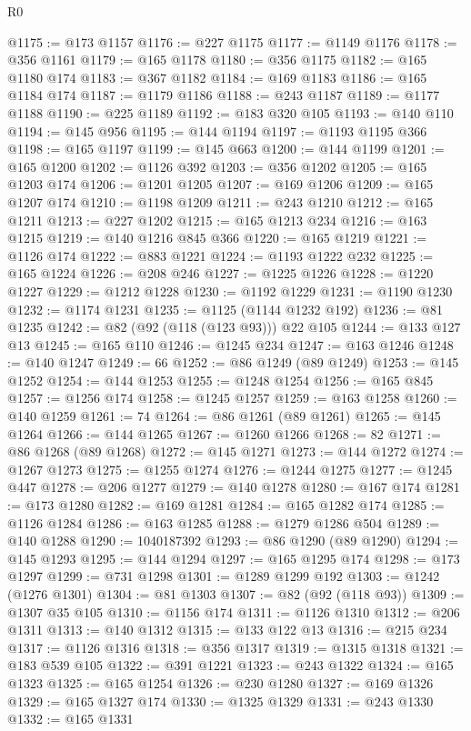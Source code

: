 \begin{lexlean}{R0}
\begin{coremodule}
@1175 := @173 @1157
@1176 := @227 @1175
@1177 := @1149 @1176
@1178 := @356 @1161
@1179 := @165 @1178
@1180 := @356 @1175
@1182 := @165 @1180 @174
@1183 := @367 @1182
@1184 := @169 @1183
@1186 := @165 @1184 @174
@1187 := @1179 @1186
@1188 := @243 @1187
@1189 := @1177 @1188
@1190 := @225 @1189
@1192 := @183 @320 @105
@1193 := @140 @110
@1194 := @145 @956
@1195 := @144 @1194
@1197 := @1193 @1195 @366
@1198 := @165 @1197
@1199 := @145 @663
@1200 := @144 @1199
@1201 := @165 @1200
@1202 := @1126 @392
@1203 := @356 @1202
@1205 := @165 @1203 @174
@1206 := @1201 @1205
@1207 := @169 @1206
@1209 := @165 @1207 @174
@1210 := @1198 @1209
@1211 := @243 @1210
@1212 := @165 @1211
@1213 := @227 @1202
@1215 := @165 @1213 @234
@1216 := @163 @1215
@1219 := @140 @1216 @845 @366
@1220 := @165 @1219
@1221 := @1126 @174
@1222 := @883 @1221
@1224 := @1193 @1222 @232
@1225 := @165 @1224
@1226 := @208 @246
@1227 := @1225 @1226
@1228 := @1220 @1227
@1229 := @1212 @1228
@1230 := @1192 @1229
@1231 := @1190 @1230
@1232 := @1174 @1231
@1235 := @1125 (@1144 @1232 @192)
@1236 := @81 @1235
@1242 := @82 (@92 (@118 (@123 @93))) @22 @105
@1244 := @133 @127 @13
@1245 := @165 @110
@1246 := @1245 @234
@1247 := @163 @1246
@1248 := @140 @1247
@1249 := 66
@1252 := @86 @1249 (@89 @1249)
@1253 := @145 @1252
@1254 := @144 @1253
@1255 := @1248 @1254
@1256 := @165 @845
@1257 := @1256 @174
@1258 := @1245 @1257
@1259 := @163 @1258
@1260 := @140 @1259
@1261 := 74
@1264 := @86 @1261 (@89 @1261)
@1265 := @145 @1264
@1266 := @144 @1265
@1267 := @1260 @1266
@1268 := 82
@1271 := @86 @1268 (@89 @1268)
@1272 := @145 @1271
@1273 := @144 @1272
@1274 := @1267 @1273
@1275 := @1255 @1274
@1276 := @1244 @1275
@1277 := @1245 @447
@1278 := @206 @1277
@1279 := @140 @1278
@1280 := @167 @174
@1281 := @173 @1280
@1282 := @169 @1281
@1284 := @165 @1282 @174
@1285 := @1126 @1284
@1286 := @163 @1285
@1288 := @1279 @1286 @504
@1289 := @140 @1288
@1290 := 1040187392
@1293 := @86 @1290 (@89 @1290)
@1294 := @145 @1293
@1295 := @144 @1294
@1297 := @165 @1295 @174
@1298 := @173 @1297
@1299 := @731 @1298
@1301 := @1289 @1299 @192
@1303 := @1242 (@1276 @1301)
@1304 := @81 @1303
@1307 := @82 (@92 (@118 @93))
@1309 := @1307 @35 @105
@1310 := @1156 @174
@1311 := @1126 @1310
@1312 := @206 @1311
@1313 := @140 @1312
@1315 := @133 @122 @13
@1316 := @215 @234
@1317 := @1126 @1316
@1318 := @356 @1317
@1319 := @1315 @1318
@1321 := @183 @539 @105
@1322 := @391 @1221
@1323 := @243 @1322
@1324 := @165 @1323
@1325 := @165 @1254
@1326 := @230 @1280
@1327 := @169 @1326
@1329 := @165 @1327 @174
@1330 := @1325 @1329
@1331 := @243 @1330
@1332 := @165 @1331

\end{coremodule}
\end{lexlean}
